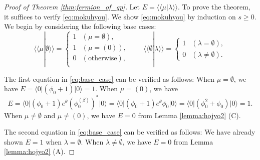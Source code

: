 \documentclass[10pt,a4paper]{amsart}
\def\bra#1{\langle #1 \vert}
\def\iinner#1#2{\langle\!\langle #1|#2\rangle\!\rangle}
\def\ket#1{\vert #1 \rangle}
\begin{document}
\begin{proof}[Proof of Theorem \ref{thm:fermion_of_gp}]

Let $E=\iinner{\mu}{\lambda}$.
To prove the theorem, it suffices to verify \eqref{eq:mokuhyou}.
We show \eqref{eq:mokuhyou} by induction on $s\geq 0$.
We begin by considering the following base cases:
\begin{equation}\label{eq:base_case}
\iinner{\mu}{\emptyset}=
\begin{cases}
1 & (\mu=\emptyset),\\
1 & (\mu=(0)),\\
0 & (\text{otherwise}),\\
\end{cases}\qquad
\iinner{\emptyset}{\lambda}
=
\begin{cases}
1 & (\lambda=\emptyset),\\
0 & (\lambda\neq \emptyset).
\end{cases}
\end{equation}

The first equation in \eqref{eq:base_case} can be verified as follows: When $\mu=\emptyset$, we have $E=\bra{0}(\phi_0+1)\ket{0}=1$.
When $\mu=(0)$, we have \[
E=
\bra{0}(\phi_0+1)e^\theta(\phi_0^{(\beta)})^\ast\ket{0}
=\bra{0}(\phi_0+1)e^\theta\phi_0\ket{0}
=\bra{0}(\phi_0^2+\phi_0)\ket{0}=1.
\]
When $\mu\neq \emptyset$ and $\mu\neq(0)$, we have $E=0$ from Lemma \ref{lemma:hojyo2} (C).

The second equation in \eqref{eq:base_case} can be verified as follows: We have already shown $E=1$ when $\lambda=\emptyset$.
When $\lambda\neq \emptyset$, we have $E=0$ from Lemma \ref{lemma:hojyo2} (A).


\end{proof}
\end{document}
